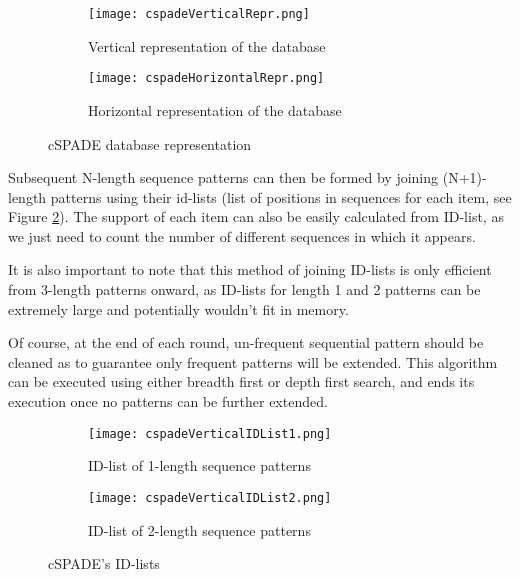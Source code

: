 \documentclass{eplmastersthesis}
\begin{document}
\begin{figure}[h]
  \centering
  \begin{subfigure}[t]{0.4\textwidth}
  	\centering
  	\texttt{[image: cspadeVerticalRepr.png]}
    \caption{Vertical representation of the database}
  \end{subfigure}
  \begin{subfigure}[t]{0.59\textwidth}
  	\centering
    \texttt{[image: cspadeHorizontalRepr.png]}
    \caption{Horizontal representation of the database}
  \end{subfigure}
  \caption{cSPADE database representation}
  \label{ex:cspadeDatabaseRepr}
\end{figure}

Subsequent N-length sequence patterns can then be formed by joining (N+1)-length patterns using their id-lists (list of positions in sequences for each item, see Figure \ref{fig:cspadeIDList}). The support of each item can also be easily calculated from ID-list, as we just need to count the number of different sequences in which it appears.  \newline

It is also important to note that this method of joining ID-lists is only efficient from 3-length patterns onward, as ID-lists for length 1 and 2 patterns can be extremely large and potentially wouldn't fit in memory. \newline

Of course, at the end of each round, un-frequent sequential pattern should be cleaned as to guarantee only frequent patterns will be extended. This algorithm can be executed using either breadth first or depth first search, and ends its execution once no patterns can be further extended.

\begin{figure}[h]
  \centering
  \begin{subfigure}[t]{0.54\textwidth}
  	\centering
  	\texttt{[image: cspadeVerticalIDList1.png]}
    \caption{ID-list of 1-length sequence patterns}
  \end{subfigure}
  \begin{subfigure}[t]{0.45\textwidth}
  	\centering
    \texttt{[image: cspadeVerticalIDList2.png]}
    \caption{ID-list of 2-length sequence patterns}
  \end{subfigure}
  \caption{cSPADE's ID-lists}
  \label{fig:cspadeIDList}
\end{figure}
\end{document}
